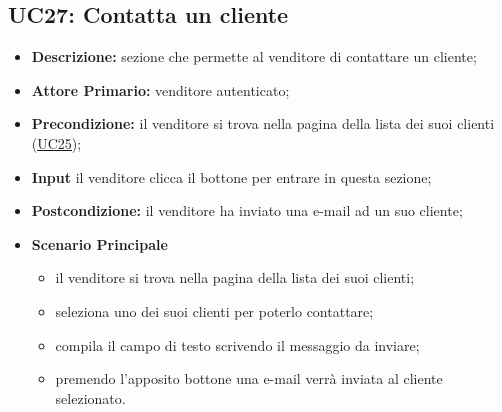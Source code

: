 \subsection{UC27: Contatta un cliente}
\label{sec:UC27}
\begin{itemize}
    \item \textbf{Descrizione:} sezione che permette al venditore di contattare un cliente;
    \item \textbf{Attore Primario:} venditore autenticato;
    \item \textbf{Precondizione:} il venditore si trova nella pagina della lista dei suoi clienti (\hyperref[sec:UC25]{\underline{UC25}});
    \item \textbf{Input} il venditore clicca il bottone per entrare in questa sezione;
    \item \textbf{Postcondizione:} il venditore ha inviato una e-mail ad un suo cliente;
    \item \textbf{Scenario Principale}
          \begin{itemize}
              \item il venditore si trova nella pagina della lista dei suoi clienti;
              \item seleziona uno dei suoi clienti per poterlo contattare;
              \item compila il campo di testo scrivendo il messaggio da inviare;
              \item premendo l'apposito bottone una e-mail verrà inviata al cliente selezionato.
          \end{itemize}
\end{itemize}